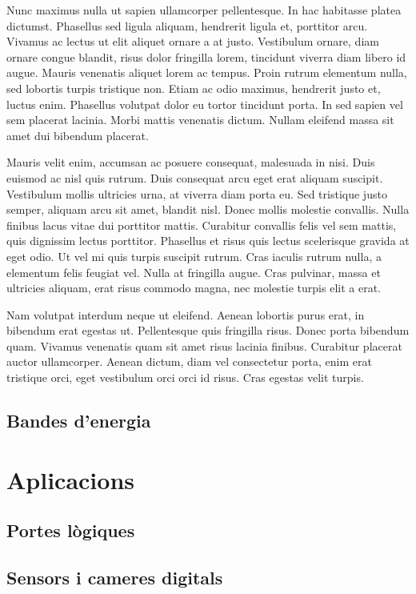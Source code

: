 \documentclass[11pt,a4paper]{article}
\begin{document}
Nunc maximus nulla ut sapien ullamcorper pellentesque. In hac habitasse platea dictumst. Phasellus sed ligula aliquam, hendrerit ligula et, porttitor arcu. Vivamus ac lectus ut elit aliquet ornare a at justo. Vestibulum ornare, diam ornare congue blandit, risus dolor fringilla lorem, tincidunt viverra diam libero id augue. Mauris venenatis aliquet lorem ac tempus. Proin rutrum elementum nulla, sed lobortis turpis tristique non. Etiam ac odio maximus, hendrerit justo et, luctus enim. Phasellus volutpat dolor eu tortor tincidunt porta. In sed sapien vel sem placerat lacinia. Morbi mattis venenatis dictum. Nullam eleifend massa sit amet dui bibendum placerat.

Mauris velit enim, accumsan ac posuere consequat, malesuada in nisi. Duis euismod ac nisl quis rutrum. Duis consequat arcu eget erat aliquam suscipit. Vestibulum mollis ultricies urna, at viverra diam porta eu. Sed tristique justo semper, aliquam arcu sit amet, blandit nisl. Donec mollis molestie convallis. Nulla finibus lacus vitae dui porttitor mattis. Curabitur convallis felis vel sem mattis, quis dignissim lectus porttitor. Phasellus et risus quis lectus scelerisque gravida at eget odio. Ut vel mi quis turpis suscipit rutrum. Cras iaculis rutrum nulla, a elementum felis feugiat vel. Nulla at fringilla augue. Cras pulvinar, massa et ultricies aliquam, erat risus commodo magna, nec molestie turpis elit a erat.

Nam volutpat interdum neque ut eleifend. Aenean lobortis purus erat, in bibendum erat egestas ut. Pellentesque quis fringilla risus. Donec porta bibendum quam. Vivamus venenatis quam sit amet risus lacinia finibus. Curabitur placerat auctor ullamcorper. Aenean dictum, diam vel consectetur porta, enim erat tristique orci, eget vestibulum orci orci id risus. Cras egestas velit turpis. 

\subsection{Bandes d'energia}


\section{Aplicacions}

\subsection{Portes lògiques}

\subsection{Sensors i cameres digitals}

\printbibliography
\end{document}

